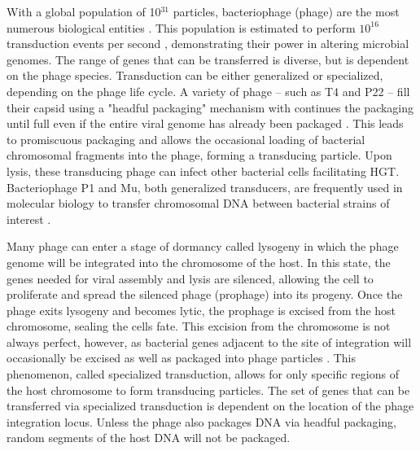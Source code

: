 With a global population of 10$^{31}$ particles, bacteriophage (phage) are the
most numerous biological entities \cite{Comeau:2008jo}. This population is estimated
to perform $10^{16}$ transduction events per second
\cite{ChibaniChennoufi:2004gv}, demonstrating their power in altering microbial
genomes. The range of genes that can be transferred is diverse, but is dependent
on the phage species. Transduction can be either generalized or specialized,
depending on the phage life cycle. A variety of phage --
such as T4 and P22 -- fill their capsid using a "headful packaging"
mechanism with continues the packaging until full even if the entire viral
genome has already been packaged \cite{Coren:1995up}. This leads to promiscuous
packaging and allows the occasional loading of bacterial chromosomal fragments into the
phage, forming a transducing particle. Upon lysis, these transducing phage can
infect other bacterial cells facilitating HGT. Bacteriophage P1 and Mu, both generalized
transducers, are frequently used in molecular biology to transfer chromosomal DNA
between bacterial strains of interest \cite{Thomason:2007gz, Wang:1987ul}.

Many phage can enter a stage of dormancy called lysogeny in which the phage
genome will be integrated into the chromosome of the host. In this state, the genes
needed for viral assembly and lysis are silenced, allowing the cell to
proliferate and spread the silenced phage (prophage) into its progeny. Once the
phage exits lysogeny and becomes lytic, the prophage is excised from the
host chromosome, sealing the cells fate. This excision from the chromosome is
not always perfect, however, as bacterial genes adjacent to
the site of integration will occasionally be excised as well as packaged into
phage particles \cite{Sato:1970tz}. This phenomenon, called specialized
transduction, allows for only specific regions of the host chromosome to form
transducing particles. The set of genes that can be transferred via specialized
transduction is dependent on the location of the phage integration locus. Unless
the phage also packages DNA via headful packaging, random segments of the host
DNA will not be packaged. 

